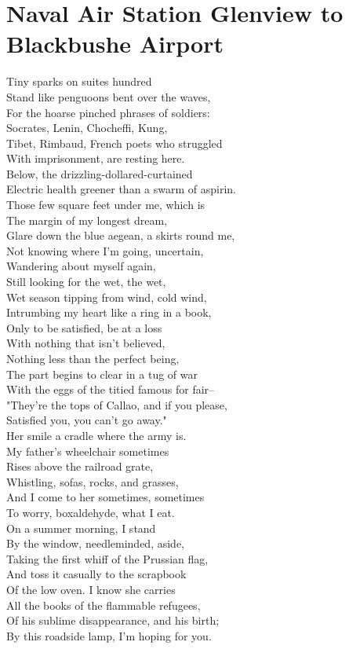 \documentclass[smalldemyvopaper,11pt,twoside,onecolumn,openright,extrafontsizes]{memoir}
\begin{document}
\chapter{Naval Air Station Glenview to Blackbushe Airport}
Tiny sparks on suites hundred
\\Stand like penguoons bent over the waves,
\\For the hoarse pinched phrases of soldiers:
\\Socrates, Lenin, Chocheffi, Kung,
\\Tibet, Rimbaud, French poets who struggled
\\With imprisonment, are resting here.
\\Below, the drizzling-dollared-curtained
\\Electric health greener than a swarm of aspirin.
\\Those few square feet under me, which is
\\The margin of my longest dream,
\\Glare down the blue aegean, a skirts round me,
\\Not knowing where I'm going, uncertain,
\\Wandering about myself again,
\\Still looking for the wet, the wet,
\\Wet season tipping from wind, cold wind,
\\Intrumbing my heart like a ring in a book,
\\Only to be satisfied, be at a loss
\\With nothing that isn't believed,
\\Nothing less than the perfect being,
\\The part begins to clear in a tug of war
\\With the eggs of the titied famous for fair--
\\"They're the tops of Callao, and if you please,
\\Satisfied you, you can't go away."
\\Her smile a cradle where the army is.
\\My father's wheelchair sometimes
\\Rises above the railroad grate,
\\Whistling, sofas, rocks, and grasses,
\\And I come to her sometimes, sometimes
\\To worry, boxaldehyde, what I eat.
\\On a summer morning, I stand
\\By the window, needleminded, aside,
\\Taking the first whiff of the Prussian flag,
\\And toss it casually to the scrapbook
\\Of the low oven. I know she carries
\\All the books of the flammable refugees,
\\Of his sublime disappearance, and his birth;
\\By this roadside lamp, I'm hoping for you.
\end{document}
